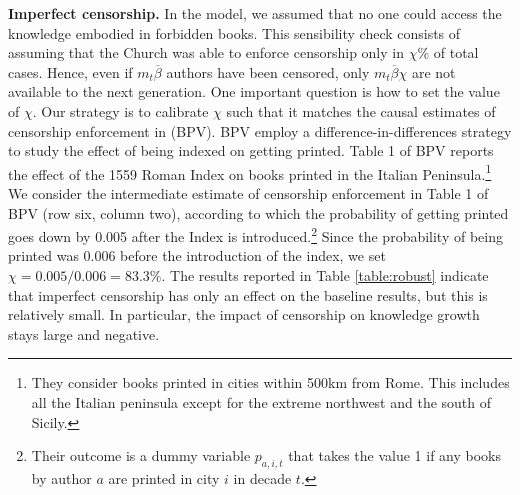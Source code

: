 \textbf{Imperfect censorship.} In the model, we assumed that no one could access the knowledge embodied in forbidden books. This sensibility check consists of assuming that the Church was able to enforce censorship only in $\chi\%$ of total cases. Hence, even if $m_t\overline{\beta}$ authors have been censored, only  $m_t\overline{\beta}\chi$ are not available to the next generation. One important question is how to set the value of $\chi$. Our strategy is to calibrate  $\chi$ such that it matches the causal estimates of censorship enforcement in  (BPV). BPV employ a difference-in-differences strategy to study the effect of being indexed on getting printed. Table 1 of BPV reports the effect of the 1559 Roman Index on books printed in the Italian Peninsula.\footnote{They consider books printed in cities within 500km from Rome. This includes all the Italian peninsula except for the extreme northwest and the south of Sicily.} We consider the intermediate estimate of censorship enforcement in Table 1 of BPV (row six, column two), according to which the probability of getting printed goes down by 0.005 after the Index is introduced.\footnote{Their outcome is a dummy variable $p_{a,i,t}$ that takes the value 1 if any books by author $a$ are printed in city $i$ in decade $t$.} Since the probability of being printed was 0.006 before the introduction of the index, we set $\chi=0.005/0.006=83.3\%$. The results reported in Table \ref{table:robust} indicate that imperfect censorship has only an effect on the baseline results, but this is relatively small. In particular, the impact of censorship on knowledge growth stays large and negative.

